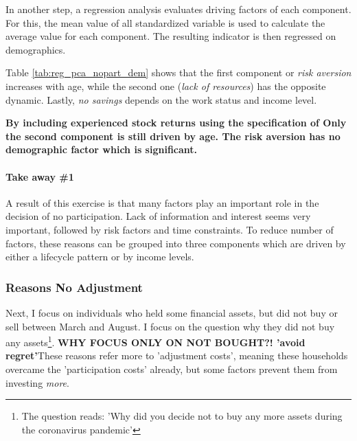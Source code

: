 \documentclass[ProjectABM]{subfiles}
\begin{document}


In another step, a regression analysis evaluates driving factors of each component. For this, the mean value of all standardized variable is used to calculate the average value for each component. The resulting indicator is then regressed on demographics.

Table \ref{tab:reg_pca_nopart_dem} shows that the first component or \textit{risk aversion} increases with age, while the second one (\textit{lack of resources}) has the opposite dynamic. Lastly, \textit{no savings} depends on the work status and income level. 



\textbf{By including experienced stock returns using the specification of \cite{malmendier_2011} Only the second component is still driven by age. The risk aversion has no demographic factor which is significant.}

\paragraph{Take away \#1}
A result of this exercise is that many factors play an important role in the decision of no participation. Lack of information and interest seems very important, followed by risk factors and time constraints. To reduce number of factors, these reasons can be grouped into three components which are driven by either a lifecycle pattern or by income levels. %

\subsubsection{Reasons No Adjustment}
Next, I focus on individuals who held some financial assets, but did not buy or sell between March and August. I focus on the question why they did not buy any assets\footnote{The question reads: 'Why did you decide not to buy any more assets during the coronavirus pandemic'}. \textbf{WHY FOCUS ONLY ON NOT BOUGHT?! 'avoid regret'}These reasons refer more to 'adjustment costs', meaning these households overcame the 'participation costs' already, but some factors prevent them from investing \textit{more}.%


\end{document}
